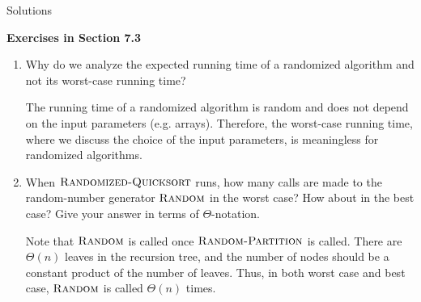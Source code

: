 \documentclass[12pt,reqno]{amsart}
\newif\ifanswer
\begin{document}
\hspace{10.5cm} {\footnotesize Solutions}

\vspace{0.5cm}
\hspace{5.5cm}\textbf{\large Exercises in Section 7.3}
\vspace{0.5cm}

\begin{enumerate}[1.]

\item Why do we analyze the expected running time of a randomized algorithm and not its worst-case running time?

\ifanswer
{}
The running time of a randomized algorithm is random and does not depend on the input parameters (e.g. arrays). Therefore, the worst-case running time, where we discuss the choice of the input parameters, is meaningless for randomized algorithms.
\vspace{1cm}



\item When $\textsc{Randomized-Quicksort}$ runs, how many calls are made to the random-number generator $\textsc{Random}$ in the worst case? How about in the best case? Give your answer in terms of $\Theta$-notation.

\ifanswer
{}
Note that $\textsc{Random}$ is called once $\textsc{Random-Partition}$ is called. There are $\Theta(n)$ leaves in the recursion tree, and the number of nodes should be a constant product of the number of leaves. Thus, in both worst case and best case, $\textsc{Random}$ is called $\Theta(n)$ times.
\vspace{1cm}



\end{enumerate}
\end{document}
